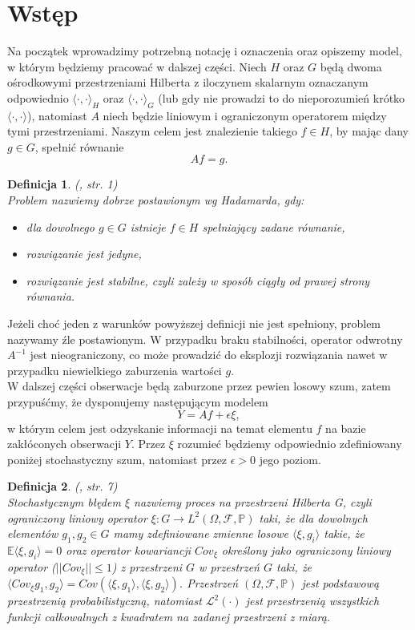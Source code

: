 \documentclass{mwart}
\newtheorem{df}{Definicja}
\begin{document}
\section{Wstęp}
Na początek wprowadzimy potrzebną notację i oznaczenia oraz opiszemy model, w którym będziemy pracować w dalszej części. 
Niech $H$ oraz $G$ będą dwoma ośrodkowymi przestrzeniami Hilberta z iloczynem skalarnym oznaczanym odpowiednio $\langle \cdot,\cdot \rangle_H$ oraz $\langle \cdot,\cdot \rangle_G$ (lub gdy nie prowadzi to do nieporozumień krótko $\langle \cdot,\cdot \rangle$), natomiast $A$ niech będzie liniowym i ograniczonym operatorem między tymi przestrzeniami. Naszym celem jest znalezienie takiego $f\in H$, by mając dany $g\in G$, spełnić równanie
\begin{displaymath}
Af=g.
\end{displaymath}
\begin{df}(\cite{szkutnik}, str. 1)\\ Problem nazwiemy dobrze postawionym wg Hadamarda, gdy:
\begin{itemize}
\item dla dowolnego $g\in G$ istnieje $f\in H$ spełniający zadane równanie,
\item rozwiązanie jest jedyne,
\item rozwiązanie jest stabilne, czyli zależy w sposób ciągły od prawej strony równania.
\end{itemize}
\end{df}
Jeżeli choć jeden z warunków powyższej definicji nie jest spełniony, problem nazywamy źle postawionym. W przypadku braku stabilności, operator odwrotny $A^{-1}$ jest nieograniczony, co może prowadzić do eksplozji rozwiązania nawet w przypadku niewielkiego zaburzenia wartości $g$.\\
\indent W dalszej części obserwacje będą zaburzone przez pewien losowy szum, zatem przypuśćmy, że dysponujemy następującym modelem 
\begin{equation}\label{Af}
Y=Af+\epsilon\xi,
\end{equation}
w którym celem jest odzyskanie informacji na temat elementu $f$ na bazie zakłóconych obserwacji $Y$. Przez $\xi$ rozumieć będziemy odpowiednio zdefiniowany poniżej stochastyczny szum, natomiast przez $\epsilon>0$ jego poziom.
\begin{df}(\cite{iphde}, str. 7)\\
Stochastycznym błędem $\xi$ nazwiemy proces na przestrzeni Hilberta G, czyli ograniczony liniowy operator $\xi\colon G\to L^2(\Omega, \mathcal{F},\mathbb{P})$ taki, że dla dowolnych elementów $g_1,g_2\in G$ mamy zdefiniowane zmienne losowe $\langle \xi, g_i\rangle$ takie, że $\mathbb{E}\langle \xi, g_i\rangle =0$ oraz operator kowariancji $Cov_{\xi}$ określony jako ograniczony liniowy operator ($||Cov_{\xi}||\leq 1$) z przestrzeni $G$ w przestrzeń $G$ taki, że $ \langle Cov_{\xi}g_1,g_2\rangle=Cov(\langle \xi,g_1\rangle,\langle \xi,g_2\rangle)$. Przestrzeń $(\Omega, \mathcal{F},\mathbb{P})$ jest podstawową przestrzenią probabilistyczną, natomiast  $\mathcal{L}^2(\cdot)$ jest przestrzenią wszystkich funkcji całkowalnych z kwadratem na zadanej przestrzeni z miarą.
\end{df}
\end{document}
